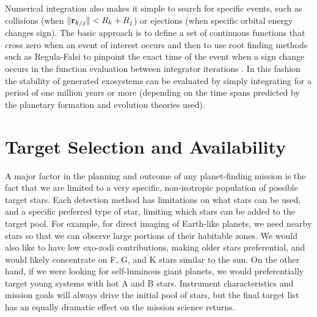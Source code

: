 Numerical integration also makes it simple to search for specific events, such as collisions (when $\Vert \mathbf r_{k/j} \Vert < R_k + R_j$) or ejections (when specific orbital energy changes sign).  The basic approach is to define a set of continuous functions that cross zero when an event of interest occurs and then to use root finding methods such as Regula-Falsi to pinpoint the exact time of the event when a sign change occurs in the function evaluation between integrator iterations \citep{press1992numerical}.  In this fashion the stability of generated exosystems can be evaluated by simply integrating for a period of one million years or more (depending on the time spans predicted by the planetary formation and evolution theories used).

\section{Target Selection and Availability}\label{sec:targ_selection}
A major factor in the planning and outcome of any planet-finding mission is the fact that we are limited to a very specific, non-isotropic population of possible target stars.  Each detection method has limitations on what stars can be used, and a specific preferred type of star, limiting which stars can be added to the target pool.  For example, for direct imaging of Earth-like planets, we need nearby stars so that we can observe large portions of their habitable zones.  We would also like to have low exo-zodi contributions, making older stars preferential, and would likely concentrate on F, G, and K stars similar to the sun.  On the other hand, if we were looking for self-luminous giant planets, we would preferentially target young systems with hot A and B stars.  Instrument characteristics and mission goals will always drive the initial pool of stars, but the final target list has an equally dramatic effect on the mission science returns.

